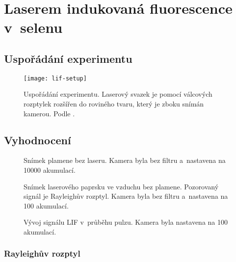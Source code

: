 \chapter[LIF]{Laserem indukovaná fluorescence v~selenu}

\providecommand\xpos{x}
\providecommand\ypos{y}
\providecommand\laser{L}
\providecommand\lif{F}

\section{Uspořádání experimentu}
\label{sec:lif-setup}

\begin{figure}
	\texttt{[image: lif-setup]}
	\caption{Uspořádání experimentu.
		Laserový svazek je pomocí válcových rozptylek rozšířen
		do roviného tvaru, který je zboku snímán kamerou.
		Podle \cite{lif-oh}.}
	\label{fig:lif-setup}
\end{figure}

\section{Vyhodnocení}
\label{sec:lif-method}

\begin{figure}
	
	\caption{Snímek plamene bez laseru.
		Kamera byla bez filtru a~nastavena na \num{10000} akumulací.}
	\label{fig:lif-flame}
\end{figure}

\begin{figure}
	
	\caption{Snímek laserového paprsku ve vzduchu bez plamene.
		Pozorovaný signál je Rayleighův rozptyl.
		Kamera byla bez filtru a~nastavena na \num{100} akumulací.}
	\label{fig:lif-beam}
\end{figure}

\begin{figure}[p]
	\makebox[\linewidth][c]{%
		
	}
	\makebox[\linewidth][c]{%
		
	}
	\makebox[\linewidth][c]{%
		
	}
	\caption{Vývoj signálu LIF v~průběhu pulzu.
		Kamera byla nastavena na \num{100} akumulací.}
	\label{fig:lif-timeev}
\end{figure}

\subsection{Rayleighův rozptyl}
\label{sec:lif-rayleigh}

